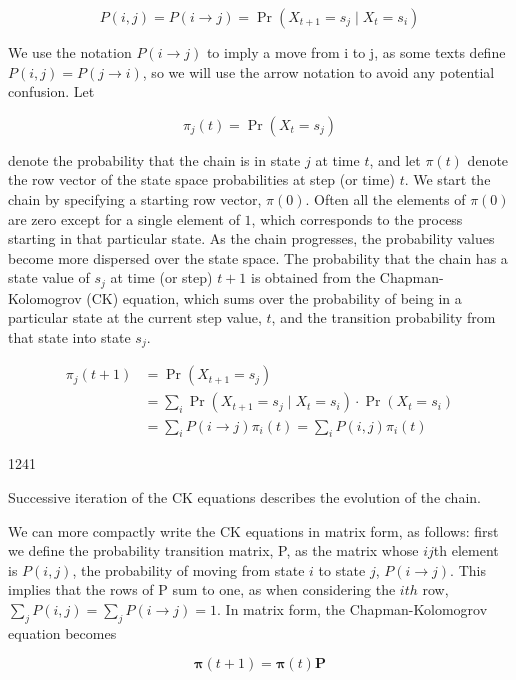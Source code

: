 \documentclass{article}
\begin{document}
\begin{equation}
P(i,j)=P(i\rightarrow j)=\Pr(X_{t+1}=s_{j}\mid X_{t}=s_{i})
\end{equation}

We use the notation  $ P(i \to j) $ to imply a move from i to j, as some texts define  $ P(i,j) = P(j \to i) $, so we will use the arrow notation to avoid any potential confusion. Let

\begin{equation}
\pi_{j}(t)=\Pr(X_{t}=s_{j})
\end{equation}

denote the probability that the chain is in state $j$ at time $t$, and let $\pi(t)$ denote the row vector of the state space probabilities at step (or time) $t$. We start the chain by specifying a starting row vector, $\pi(0)$. Often all the elements of $\pi(0)$ are zero except for a single element of $1$, which corresponds to the process starting in that particular state. As the chain progresses, the probability values become more dispersed over the state space. The probability that the chain has a state value of $s_j$ at time (or step) $t+1$ is obtained from the Chapman-Kolomogrov (CK) equation, which sums over the probability of being in a particular state at the current step value, $t$, and the transition probability from that state into state $s_j$.

\begin{equation}
\begin{aligned}\pi_{j}(t+1)&=\Pr(X_{t+1}=s_{j})\\&=\sum_{i}\Pr(X_{t+1}=s_{j}\mid X_{t}=s_{i})\cdot\Pr(X_{t}=s_{i})\\&=\sum_{i}P(i\rightarrow j)\pi_{i}(t)=\sum_{i}P(i,j)\pi_{i}(t)\end{aligned}
\end{equation}

1241

Successive iteration of the CK equations describes the evolution of the chain.

We can more compactly write the CK equations in matrix form, as follows: first we define the probability transition matrix, P, as the matrix whose  $ ij $th element is  $ P(i,j) $, the probability of moving from state  $ i $ to state  $ j $,  $ P(i \rightarrow j) $. This implies that the rows of P sum to one, as when considering the  $ ith $ row,  $ \sum_j P(i,j) = \sum_j P(i \rightarrow j) = 1 $. In matrix form, the Chapman-Kolomogrov equation becomes

\begin{equation}
\boldsymbol{\pi}(t+1)=\boldsymbol{\pi}(t)\mathbf{P}
\end{equation}
\end{document}
